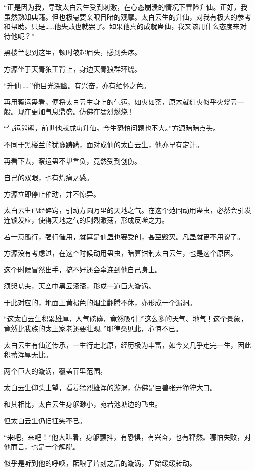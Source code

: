 \begin{this_body}
“正是因为我，导致太白云生受到刺激，在心态崩溃的情况下冒险升仙。正好，我虽然熟知典籍。但也极需要亲眼目睹的观摩。太白云生的升仙，对我有极大的参考和帮助。只是……他失败也就罢了。如果他真的成就蛊仙，我又该用什么态度来对待他呢？”

黑楼兰想到这里，顿时皱起眉头，感到头疼。

方源坐于天青狼王背上，身边天青狼群环绕。

“升仙……”他目光深幽。有兴奋，亦有缅怀之色。

再用察运蛊看，便将太白云生身上的气运，如火如荼，原本就红火似乎火烧云一般。现在更加气息鼎盛。仿佛在猛烈燃烧！

“气运熊熊，前世他就成功升仙。今生恐怕问题也不大。”方源暗暗点头。

不同于黑楼兰的犹豫踌躇，面对成仙的太白云生，他亦早有定计。

再看下去，察运蛊不堪重负，竟然受到创伤。

自己的双眼，也有灼痛之感。

方源立即停止催动，并不惊异。

太白云生已经碎窍，引动方圆万里的天地之气。在这个范围动用蛊虫，必然会引发连锁发应，使得天地之气的剧烈激荡，形成反噬之力。

若一意孤行，强行催用，就算是仙蛊也要受创，甚至毁灭。凡蛊就更不用说了。

方源没有考虑过，在这个时候动用蛊虫，暗算钳制太白云生，也是这个原因。

这个时候冒然出手，搞不好还会牵连到他自己身上。

须臾功夫，天空中黑云滚滚，形成一道巨大漩涡。

于此对应的，地面上黄褐色的烟尘翻腾不休，亦形成一个漏洞。

“这太白云生积累雄厚，人气磅礴，竟然吸引了这么多的天气、地气！这个景象，竟然比我族的太上家老还要壮观。”耶律桑见此，心惊不已。

太白云生有仙道传承，一生行走北原，经历极为丰富，如今又几乎走完一生，因此积蓄浑厚无比。

两个巨大的漩涡，覆盖百里范围。

太白云生仰头上望，看着猛烈雄浑的漩涡，仿佛是巨兽张开狰狞大口。

和其相比，太白云生身躯渺小，宛若池塘边的飞虫。

但太白云生仍旧狂笑不已。

“来吧，来吧！”他大叫着，身躯颤抖，有恐惧，有兴奋，也有释然。哪怕失败，对他而言，也是一个解脱。

似乎是听到他的呼唤，酝酿了片刻之后的漩涡，开始缓缓转动。


\end{this_body}
